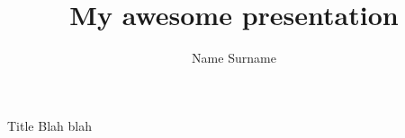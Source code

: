 \documentclass{beamer}
\title{My awesome presentation}
\author{Name Surname}
\begin{document}
\begin{frame}{Title}
Blah blah
\end{frame}
\end{document}
